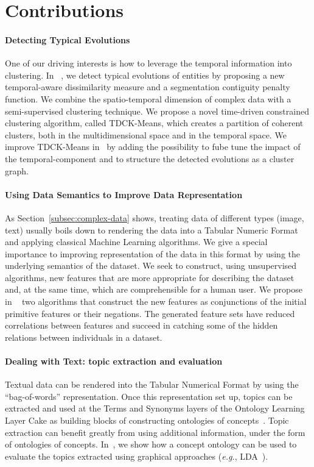 \documentclass{article}
\begin{document}
\section{Contributions}

\paragraph{Detecting Typical Evolutions}
One of our driving interests is how to leverage the temporal information into clustering.
In ~\cite{RIZ12}, we detect typical evolutions of entities by proposing a new temporal-aware dissimilarity measure and a segmentation contiguity penalty function. 
We combine the spatio-temporal dimension of complex data with a semi-supervised clustering technique. 
We propose a novel time-driven constrained clustering algorithm, called TDCK-Means, which creates a partition of coherent clusters, both in the multidimensional space and in the temporal space.
We improve TDCK-Means in~\cite{RIZ13c} by adding the possibility to fube tune the impact of the temporal-component and to structure the detected evolutions as a cluster graph.

\paragraph{Using Data Semantics to Improve Data Representation}
As Section~\ref{subsec:complex-data} shows, treating data of different types (image, text) usually boils down to rendering the data into a Tabular Numeric Format and applying classical Machine Learning algorithms.
We give a special importance to improving representation of the data in this format by using the underlying semantics of the dataset.
We seek to construct, using unsupervised algorithms, new features that are more appropriate for describing the dataset and, at the same time, which are comprehensible for a human user. 
We propose in ~\cite{RIZ13a} two algorithms that construct the new features as conjunctions of the initial primitive features or their negations. 
The generated feature sets have reduced correlations between features and succeed in catching some of the hidden relations between individuals in a dataset. 

\paragraph{Dealing with Text: topic extraction and evaluation}
Textual data can be rendered into the Tabular Numerical Format by using the ``bag-of-words'' representation.
Once this representation set up, topics can be extracted and used at the Terms and Synonyms layers of the Ontology Learning Layer Cake as building blocks of constructing ontologies of concepts~\cite{RIZ11}.
Topic extraction can benefit greatly from using additional information, under the form of ontologies of concepts.
In~\cite{MUS11}, we show how a concept ontology can be used to evaluate the topics extracted using graphical approaches (\textit{e.g.}, LDA~\cite{BLE03}).
\end{document}
